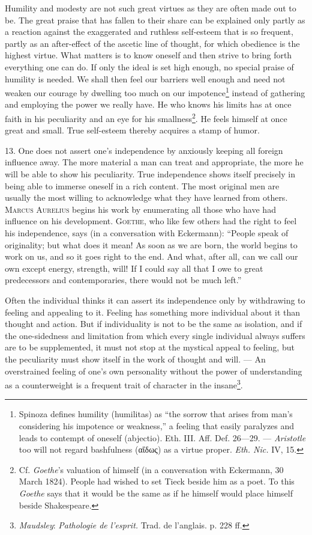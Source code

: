 \documentclass[12pt,a4paper,openany]{book}
\newcommand{\opage}[1]{\marginnote{\footnotesize\textit{[#1]}}}
\begin{document}
Humility and modesty are not such great virtues as they are often made out to be. The great praise that has fallen
to their share can be explained only partly as a reaction against the exaggerated and ruthless self-esteem that is
so frequent, partly
\opage{232}as an after-effect of the ascetic line of thought, for which obedience is the highest virtue. What matters
is to know oneself and then strive to bring forth everything one can do. If only the ideal is set high enough, no
special praise of humility is needed. We shall then feel our barriers well enough and need not weaken our courage by
dwelling too much on our impotence\footnote[1]{Spinoza defines humility (humilitas) as ``the sorrow that arises from
man's considering his impotence or weakness,'' a feeling that easily paralyzes and leads to contempt of oneself
(abjectio). Eth. III. Aff. Def. 26---29. --- \emph{Aristotle} too will not regard bashfulness (αἴδως) as a virtue
proper. \textit{Eth. Nic.} IV, 15.} instead of gathering and employing the power we really have. He who knows his
limits has at once faith in his peculiarity and an eye for his smallness\footnote[2]{Cf. \emph{Goethe}'s valuation
of himself (in a conversation with Eckermann, 30 March 1824). People had wished to set Tieck beside him as a poet. To
this \emph{Goethe} says that it would be the same as if he himself would place himself beside Shakespeare.}. He feels
himself at once great and small. True self-esteem thereby acquires a stamp of humor.

13. One does not assert one's independence by anxiously keeping all foreign influence away. The more material a man
can treat and appropriate, the more he will be able to show his peculiarity. True independence shows itself
precisely in being able to immerse oneself in a rich content. The most original men are usually the most willing to
acknowledge what they have learned from others. \textsc{Marcus Aurelius} begins his work by enumerating all those
who have had influence on his development. \textsc{Goethe}, who like few others had the right to feel his
independence, says (in a conversation with Eckermann): ``People speak of originality; but what does it mean! As soon
as we are born, the world begins to work on us, and so it goes right to the end. And what, after all, can we call
our own except energy, strength, will! If I could say all that I owe to great predecessors and contemporaries, there
would not be much left.''

Often the individual thinks it can assert its independence
\opage{233}only by withdrawing to feeling and appealing to it. Feeling has something more individual about it than
thought and action. But if individuality is not to be the same as isolation, and if the one-sidedness and limitation
from which every single individual always suffers are to be supplemented, it must not stop at the mystical appeal to
feeling, but the peculiarity must show itself in the work of thought and will. --- An overstrained feeling of one's
own personality without the power of understanding as a counterweight is a frequent trait of character in the
insane\footnote[1]{\emph{Maudsley}: \textit{Pathologie de l'esprit.} Trad. de l'anglais. p. 228 ff.}.
\end{document}
